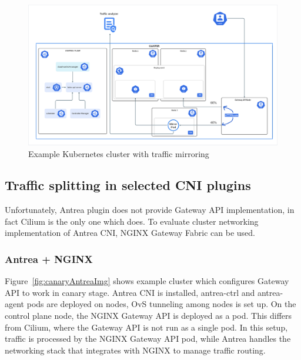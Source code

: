 \begin{figure}[H]
    \centering
    \includegraphics[width=1\columnwidth]{images/ingress.png}
    \caption{Example Kubernetes cluster with traffic mirroring}
    \label{fig:mirroringImg}
\end{figure}


\subsection{Traffic splitting in selected CNI plugins}
\label{subsection:trafficSplitting}

Unfortunately, Antrea plugin does not provide Gateway API implementation, in fact Cilium is the only one which does. To evaluate cluster networking implementation of Antrea CNI, NGINX Gateway Fabric can be used. 



\subsubsection{Antrea + NGINX}
\label{subsection:antreaIngress}

Figure~\ref{fig:canaryAntreaImg} shows example cluster which configures Gateway API to work in canary stage. Antrea CNI is installed, antrea-ctrl and antrea-agent pods are deployed on nodes, OvS tunneling among nodes is set up. On the control plane node, the NGINX Gateway API is deployed as a pod. This differs from Cilium, where the Gateway API is not run as a single pod. In this setup, traffic is processed by the NGINX Gateway API pod, while Antrea handles the networking stack that integrates with NGINX to manage traffic routing.

